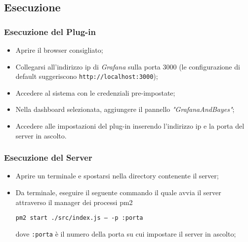 	
\subsection{Esecuzione}\label{run}
\subsubsection{Esecuzione del Plug-in}
\begin{itemize}
	\item Aprire il browser consigliato; 
	\item Collegarsi all'indirizzo ip di \textit{Grafana} sulla porta 3000 (le configurazione di default suggeriscono \texttt{http://localhost:3000}); 
	\item Accedere al sistema con le credenziali pre-impostate; 
	\item Nella dashboard selezionata, aggiungere il pannello \textit{"GrafanaAndBayes"}; 
	\item Accedere alle impostazioni del plug-in inserendo l'indirizzo ip e la porta del server in ascolto. 
\end{itemize}


\subsubsection{Esecuzione del Server}
\begin{itemize}
	\item Aprire un terminale e spostarsi nella directory contenente il server; 
	\item Da terminale, eseguire il seguente commando il quale avvia il server attraverso il manager dei processi pm2
	\begin{center}
		\texttt{pm2 start ./src/index.js --- -p :porta}
	\end{center}
	dove \texttt{:porta} è il numero della porta su cui impostare il server in ascolto; 
\end{itemize}
	